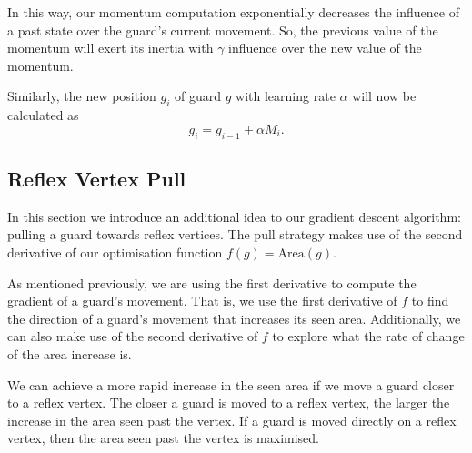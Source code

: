 In this way, our momentum computation exponentially decreases the influence of a past state over the guard's current movement. So, the previous value of the momentum will exert its inertia with $\gamma$ influence over the new value of the momentum.

Similarly, the new position $g_i$ of guard $g$ with learning rate $\alpha$ will now be calculated as $$g_i = g_{i - 1} + \alpha M_i.$$


\subsection{Reflex Vertex Pull}

In this section we introduce an additional idea to our gradient descent algorithm: pulling a guard towards reflex vertices. The pull strategy makes use of the second derivative of our optimisation function $f(g) = \text{Area}(g)$.



As mentioned previously, we are using the first derivative to compute the gradient of a guard's movement. That is, we use the first derivative of $f$ to find the direction of a guard's movement that increases its seen area. Additionally, we can also make use of the second derivative of $f$ to explore what the rate of change of the area increase is. 

We can achieve a more rapid increase in the seen area if we move a guard closer to a reflex vertex. The closer a guard is moved to a reflex vertex, the larger the increase in the area seen past the vertex. If a guard is moved directly on a reflex vertex, then the area seen past the vertex is maximised. 



